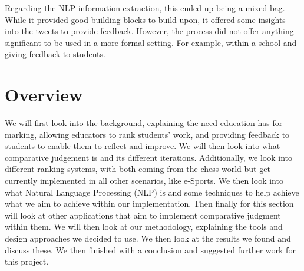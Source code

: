 		Regarding the NLP information extraction, this ended up being a mixed bag. While it provided good building blocks to build upon, it offered some insights into the tweets to provide feedback. However, the process did not offer anything significant to be used in a more formal setting. For example, within a school and giving feedback to students.
	
	\section{Overview}  
	\label{sec:intro_overview}
		We will first look into the background, explaining the need education has for marking, allowing educators to rank students' work, and providing feedback to students to enable them to reflect and improve. We will then look into what comparative judgement is and its different iterations. Additionally, we look into different ranking systems, with both coming from the chess world but get currently implemented in all other scenarios, like e-Sports. We then look into what Natural Language Processing (NLP) is and some techniques to help achieve what we aim to achieve within our implementation. Then finally for this section will look at other applications that aim to implement comparative judgment within them. We will then look at our methodology, explaining the tools and design approaches we decided to use. We then look at the results we found and discuss these. We then finished with a conclusion and suggested further work for this project. 
